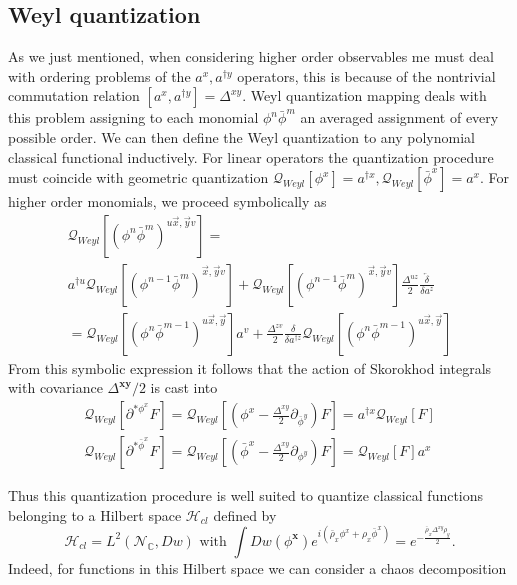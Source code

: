\documentclass[12pt]{article}%
\begin{document}
\subsection{Weyl quantization}
As we just mentioned, 
when considering higher order observables me must deal with ordering problems of the $a^x,a^{\dagger y}$ operators, this is because of the nontrivial commutation relation $[a^x,a^{\dagger y}]=\Delta^{xy}$.  Weyl quantization mapping deals with this problem assigning to each monomial $\phi^n\bar\phi^m$ an averaged assignment of every possible order. We can then define the Weyl quantization to any polynomial classical functional inductively. For linear operators the quantization procedure must coincide with geometric quantization  $\mathcal{Q}_{Weyl}[\phi^x]=a^{\dagger x},   \mathcal{Q}_{Weyl}[\bar\phi^x]=a^{x}$. For higher order monomials, we proceed  symbolically as
\begin{multline}
\label{eq:weylaverage}
     \mathcal{Q}_{Weyl}[(\phi^n\bar\phi^m)^{u\vec{x},\vec{y}v}]=\\
   a^{\dagger u}\mathcal{Q}_{Weyl}[(\phi^{n-1}\bar\phi^m)^{\vec{x},\vec{y}v}]+\mathcal{Q}_{Weyl}[(\phi^{n-1}\bar\phi^m)^{\vec{x},\vec{y}v}]\frac{\Delta^{uz}}2\frac{\overleftarrow{\delta}}{\delta a^z}\\=\mathcal{Q}_{Weyl}[(\phi^{n}\bar\phi^{m-1})^{u\vec{x},\vec{y}}]a^{v}+\frac{\Delta^{zv}}2\frac{{\delta}}{\delta a^{\dagger z}}\mathcal{Q}_{Weyl}[(\phi^{n}\bar\phi^{m-1})^{u\vec{x},\vec{y}}]
\end{multline}
From this symbolic expression it follows that the action of Skorokhod integrals with covariance $\Delta^{\mathbf{xy}}/2$ is cast into
\begin{align}
\label{eq:WheylSkorokhod}
    \mathcal{Q}_{Weyl}[\partial^{*\phi^x}F]=\mathcal{Q}_{Weyl}[(\phi^x-{\frac{\Delta^{xy}}{2}\partial_{\bar\phi^y}})F]=a^{\dagger x}  \mathcal{Q}_{Weyl}[F]\nonumber \\
    \mathcal{Q}_{Weyl}[\partial^{*\bar\phi^x}F]=\mathcal{Q}_{Weyl}[(\bar\phi^x-{\frac{\Delta^{xy}}{2}\partial_{\phi^y}})F]=\mathcal{Q}_{Weyl}[F]a^{x}  
\end{align}


Thus this  quantization procedure is well suited to quantize classical functions belonging to a Hilbert space $\mathcal{H}_{cl}$ defined by
$$\mathcal{H}_{cl}=L^2(\mathcal{N}_{\mathbb{C}}, Dw)\textrm{ with }\int Dw(\phi^{\mathbf{x}})e^{i (\bar\rho_x\phi^x+\rho_x\bar \phi^x) }= e^{-\frac{\bar\rho_x\Delta^{xy}\rho_y}{2} }.$$
Indeed, for functions in this Hilbert space we can consider a chaos decomposition 
\end{document}
